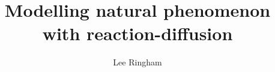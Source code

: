 \documentclass{thesis}
\theoremstyle{plain}
\theoremstyle{definition}
\begin{document}


  \title{Modelling natural phenomenon with reaction-diffusion}
  \author{Lee Ringham}
  

  \frontmatter           %
  \makethesistitle       %


\end{document}
